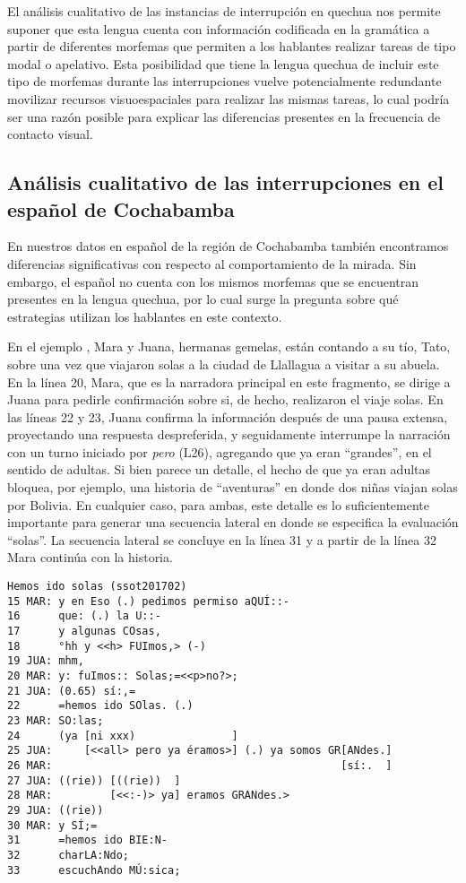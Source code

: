 \documentclass[output=paper]{../langscibook}
\begin{document}
El análisis cualitativo de las instancias de interrupción en quechua nos permite suponer que esta lengua cuenta con información codificada en la gramática a partir de diferentes morfemas que permiten a los hablantes realizar tareas de tipo modal o apelativo. Esta posibilidad que tiene la lengua quechua de incluir este tipo de morfemas durante las interrupciones vuelve potencialmente redundante movilizar recursos visuoespaciales para realizar las mismas tareas, lo cual podría ser una razón posible para explicar las diferencias presentes en la frecuencia de contacto visual.

\subsection{Análisis cualitativo de las interrupciones en el español de Cochabamba}\label{sec:satti:3.5}

En nuestros datos en español de la región de Cochabamba también encontramos diferencias significativas con respecto al comportamiento de la mirada. Sin embargo, el español no cuenta con los mismos morfemas que se encuentran presentes en la lengua quechua, por lo cual surge la pregunta sobre qué estrategias utilizan los hablantes en este contexto.

En el ejemplo , Mara y Juana, hermanas gemelas, están contando a su tío, Tato, sobre una vez que viajaron solas a la ciudad de Llallagua a visitar a su abuela. En la línea 20, Mara, que es la narradora principal en este fragmento, se dirige a Juana para pedirle confirmación sobre si, de hecho, realizaron el viaje solas.  En las líneas 22 y 23, Juana confirma la información después de una pausa extensa, proyectando una respuesta despreferida, y seguidamente interrumpe la narración con un turno iniciado por \textit{pero} (L26), agregando que ya eran “grandes”, en el sentido de adultas. Si bien parece un detalle, el hecho de que ya eran adultas bloquea, por ejemplo, una historia de “aventuras” en donde dos niñas viajan solas por Bolivia. En cualquier caso, para ambas, este detalle es lo suficientemente importante para generar una secuencia lateral en donde se especifica la evaluación “solas”. La secuencia lateral se concluye en la línea 31 y a partir de la línea 32 Mara continúa con la historia.

\ea\label{ex:satti:13}
\begin{verbatim}
Hemos ido solas (ssot201702)
15 MAR: y en Eso (.) pedimos permiso aQUÍ::-
16      que: (.) la U::-
17      y algunas COsas,
18      °hh y <<h> FUImos,> (-)
19 JUA: mhm,
20 MAR: y: fuImos:: Solas;=<<p>no?>;
21 JUA: (0.65) sí:,=
22      =hemos ido SOlas. (.)
23 MAR: SO:las;
24      (ya [ni xxx)               ]
25 JUA:     [<<all> pero ya éramos>] (.) ya somos GR[ANdes.]
26 MAR:                                             [sí:.  ]
27 JUA: ((rie)) [((rie))  ]
28 MAR:         [<<:-)> ya] eramos GRANdes.>
29 JUA: ((rie))
30 MAR: y SÍ;=
31      =hemos ido BIE:N-
32      charLA:Ndo;
33      escuchAndo MÚ:sica;
\end{verbatim}
\z
\end{document}
